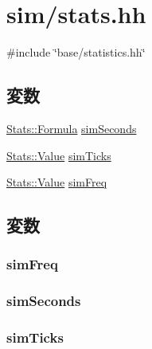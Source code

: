 \hypertarget{stats_8hh}{
\section{sim/stats.hh}
\label{stats_8hh}
}
{\ttfamily \#include \char`\"{}base/statistics.hh\char`\"{}}\par
\subsection*{変数}
\begin{DoxyCompactItemize}
\item 
\hyperlink{classStats_1_1Formula}{Stats::Formula} \hyperlink{stats_8hh_aaad77dbb4162ef5a66c24dcd1ce256d0}{simSeconds}
\item 
\hyperlink{classStats_1_1Value}{Stats::Value} \hyperlink{stats_8hh_a7d4c467738eb0a3ad90786862eec30d6}{simTicks}
\item 
\hyperlink{classStats_1_1Value}{Stats::Value} \hyperlink{stats_8hh_aa5fecf5622b2dbbf721e85e26fdc28af}{simFreq}
\end{DoxyCompactItemize}


\subsection{変数}
\hypertarget{stats_8hh_aa5fecf5622b2dbbf721e85e26fdc28af}{
\subsubsection[{simFreq}]{ {\bf simFreq}}}
\label{stats_8hh_aa5fecf5622b2dbbf721e85e26fdc28af}
\hypertarget{stats_8hh_aaad77dbb4162ef5a66c24dcd1ce256d0}{
\subsubsection[{simSeconds}]{ {\bf simSeconds}}}
\label{stats_8hh_aaad77dbb4162ef5a66c24dcd1ce256d0}
\hypertarget{stats_8hh_a7d4c467738eb0a3ad90786862eec30d6}{
\subsubsection[{simTicks}]{ {\bf simTicks}}}
\label{stats_8hh_a7d4c467738eb0a3ad90786862eec30d6}
